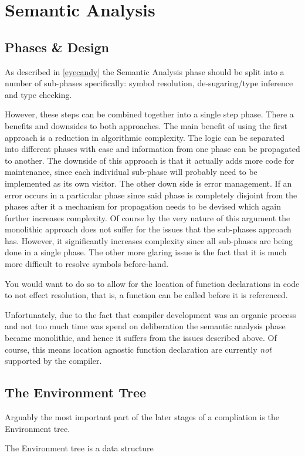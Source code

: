 \section{Semantic Analysis}

\subsection{Phases \& Design}

As described in \ref{eyecandy} the Semantic Analysis phase
should be split into a number of sub-phases specifically: symbol
resolution, de-sugaring/type inference and type checking.

However, these steps can be combined together into a single step
phase. There a benefits and downsides to both approaches. The
main benefit of using the first approach is a reduction in
algorithmic complexity. The logic can be separated into
different phases with ease and information from one phase can be
propagated to another. The downside of this approach is that it
actually adds more code for maintenance, since each individual
sub-phase will probably need to be implemented as its own
visitor. The other down side is error management. If an error
occurs in a particular phase since said phase is completely
disjoint from the phases after it a mechanism for propagation
needs to be devised which again further increases complexity. Of
course by the very nature of this argument the monolithic
approach does not suffer for the issues that the sub-phases
approach has. However, it significantly increases complexity
since all sub-phases are being done in a single phase. The other
more glaring issue is the fact that it is much more difficult to
resolve symbols before-hand.

You would want to do so to allow for the location of function
declarations in code to not effect resolution, that is, a
function can be called before it is referenced.

Unfortunately, due to the fact that compiler development was an
organic process and not too much time was spend on deliberation
the semantic analysis phase became monolithic, and hence it
suffers from the issues described above. Of course, this means
location agnostic function declaration are currently \emph{not}
supported by the compiler.

\subsection{The Environment Tree}

Arguably the most important part of the later stages of
a compliation is the Environment tree.

The Environment tree is a data structure
